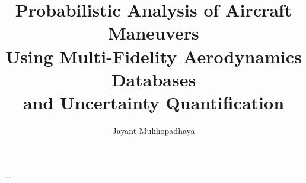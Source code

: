 \documentclass{report}
\begin{document}
\title{Probabilistic Analysis of Aircraft Maneuvers \\
            Using Multi-Fidelity Aerodynamics Databases \\
            and Uncertainty Quantification}
\author{Jayant Mukhopadhaya}
 
\beforepreface
% 

\afterpreface



% 

% 

% 

% 

% 


...


\end{document}
